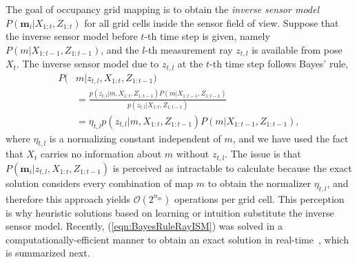 \documentclass[letterpaper, 10pt]{ieeeconf}
\newcommand{\refeqn}[1]{(\ref{eqn:#1})}
\begin{document}
The goal of occupancy grid mapping is to obtain the \emph{inverse sensor model} $P(\mathbf{m}_i|X_{1:t},Z_{1:t})$ for all grid cells inside the sensor field of view.
Suppose that the inverse sensor model before $t$-th time step is given, namely $P(m|X_{1:t-1},Z_{1:t-1})$, and the $l$-th measurement ray $z_{t,l}$ is available from pose $X_t$.
The inverse sensor model due to $z_{t,l}$ at the $t$-th time step follows Bayes' rule,
\begin{align}
\label{eqn:BayesRuleRayISM}
P(&m|z_{t,l},X_{1:t},Z_{1:t-1})\nonumber
\\
&=\frac{p(z_{t,l}|m,X_{1:t},Z_{1:t-1})P(m|X_{1:t-1},Z_{1:t-1})}{p(z_{t,l}|X_{1:t},Z_{1:t-1})}\nonumber
\\
&=\eta_{t,l}p(z_{t,l}|m,X_{1:t},Z_{1:t-1})P(m|X_{1:t-1},Z_{1:t-1}),
\end{align}
where $\eta_{t,l}$ is a normalizing constant independent of $m$, and we have used the fact that $X_t$ carries no information about $m$ without $z_{t,l}$. The issue is that $P(\mathbf{m}_i|z_{t,l},X_{1:t},Z_{1:t-1})$ is perceived as intractable to calculate because the exact solution considers every combination of map $m$ to obtain the normalizer $\eta_{t,l}$, and therefore this approach yields $\mathcal O(2^{n_m})$ operations per grid cell. This perception is why heuristic solutions based on learning or intuition substitute the inverse sensor model. Recently, \refeqn{BayesRuleRayISM} was solved in a computationally-efficient manner to obtain an exact solution in real-time~\cite{KauLeeAiMos16}, which is summarized next.
\end{document}
